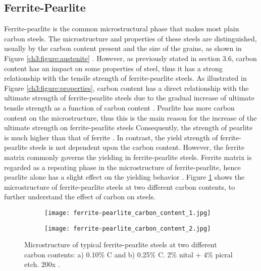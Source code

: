 \subsection{Ferrite-Pearlite}
Ferrite-pearlite is the common microstructural phase that makes most plain carbon steels. The microstructure and properties of these steels are distinguished, usually by the carbon content present and the size of the grains, as shown in Figure \ref{ch3:figure:austenite} \cite{molabe2018determining}. However, as previously stated in section 3.6, carbon content has an impact on some properties of steel, thus it has a strong relationship with the tensile strength of ferrite-pearlite steels. As illustrated in Figure \ref{ch3:figure:properties}, carbon content has a direct relationship with the ultimate strength of ferrite-pearlite steels due to the gradual increase of ultimate tensile strength as a function of carbon content \cite{cmrp2014maintenance}. 
Pearlite has more carbon content on the microstructure, thus this is the main reason for the increase of the ultimate strength on ferrite-pearlite steels \cite{bajaj2020steels} Consequently, the strength of pearlite is much higher than that of ferrite \cite{molabe2018determining}. In contrast, the yield strength of ferrite-pearlite steels is not dependent upon the carbon content. However, the ferrite matrix commonly governs the yielding in ferrite-pearlite steels. Ferrite matrix is regarded as a repeating phase in the microstructure of ferrite-pearlite, hence pearlite alone has a slight effect on the yielding behavior \cite{molabe2018determining}. Figure \ref{ch3:figure:contents} shows the microstructure of ferrite-pearlite steels at two different carbon contents, to further understand the effect of carbon on steels.

\begin{figure}[H]

\centering
\begin{subfigure}{.45\textwidth}
    \centering
    \texttt{[image: ferrite-pearlite\_carbon\_content\_1.jpg]}
    \caption{}
\end{subfigure}
\begin{subfigure}{.45\textwidth}
    \centering
    \texttt{[image: ferrite-pearlite\_carbon\_content\_2.jpg]}
    \caption{}
\end{subfigure}

\caption{Microstructure of typical ferrite-pearlite steels at two different carbon contents: a) 0.10\% C and b) 0.25\% C. 2\% nital + 4\% picral etch. 200x \cite{molabe2018determining}.}
\label{ch3:figure:contents}
\end{figure}
 
